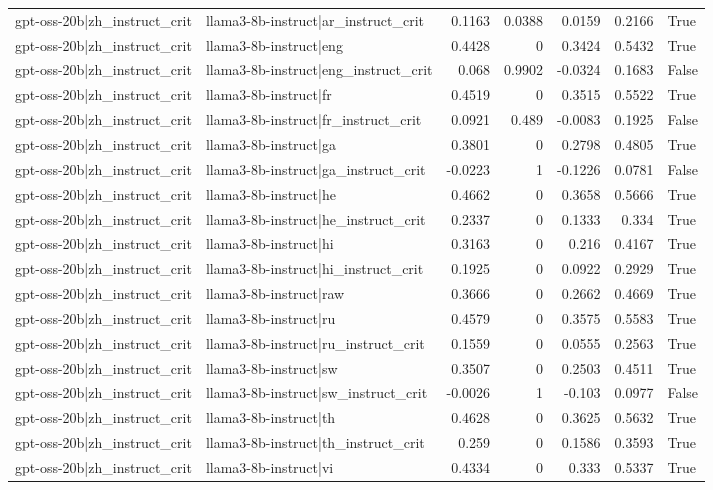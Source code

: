 \begin{table}
\begin{tabular}{l l r r r r l}
gpt-oss-20b|zh_instruct_crit & llama3-8b-instruct|ar_instruct_crit & 0.1163 & 0.0388 & 0.0159 & 0.2166 & True \\
gpt-oss-20b|zh_instruct_crit & llama3-8b-instruct|eng & 0.4428 & 0 & 0.3424 & 0.5432 & True \\
gpt-oss-20b|zh_instruct_crit & llama3-8b-instruct|eng_instruct_crit & 0.068 & 0.9902 & -0.0324 & 0.1683 & False \\
gpt-oss-20b|zh_instruct_crit & llama3-8b-instruct|fr & 0.4519 & 0 & 0.3515 & 0.5522 & True \\
gpt-oss-20b|zh_instruct_crit & llama3-8b-instruct|fr_instruct_crit & 0.0921 & 0.489 & -0.0083 & 0.1925 & False \\
gpt-oss-20b|zh_instruct_crit & llama3-8b-instruct|ga & 0.3801 & 0 & 0.2798 & 0.4805 & True \\
gpt-oss-20b|zh_instruct_crit & llama3-8b-instruct|ga_instruct_crit & -0.0223 & 1 & -0.1226 & 0.0781 & False \\
gpt-oss-20b|zh_instruct_crit & llama3-8b-instruct|he & 0.4662 & 0 & 0.3658 & 0.5666 & True \\
gpt-oss-20b|zh_instruct_crit & llama3-8b-instruct|he_instruct_crit & 0.2337 & 0 & 0.1333 & 0.334 & True \\
gpt-oss-20b|zh_instruct_crit & llama3-8b-instruct|hi & 0.3163 & 0 & 0.216 & 0.4167 & True \\
gpt-oss-20b|zh_instruct_crit & llama3-8b-instruct|hi_instruct_crit & 0.1925 & 0 & 0.0922 & 0.2929 & True \\
gpt-oss-20b|zh_instruct_crit & llama3-8b-instruct|raw & 0.3666 & 0 & 0.2662 & 0.4669 & True \\
gpt-oss-20b|zh_instruct_crit & llama3-8b-instruct|ru & 0.4579 & 0 & 0.3575 & 0.5583 & True \\
gpt-oss-20b|zh_instruct_crit & llama3-8b-instruct|ru_instruct_crit & 0.1559 & 0 & 0.0555 & 0.2563 & True \\
gpt-oss-20b|zh_instruct_crit & llama3-8b-instruct|sw & 0.3507 & 0 & 0.2503 & 0.4511 & True \\
gpt-oss-20b|zh_instruct_crit & llama3-8b-instruct|sw_instruct_crit & -0.0026 & 1 & -0.103 & 0.0977 & False \\
gpt-oss-20b|zh_instruct_crit & llama3-8b-instruct|th & 0.4628 & 0 & 0.3625 & 0.5632 & True \\
gpt-oss-20b|zh_instruct_crit & llama3-8b-instruct|th_instruct_crit & 0.259 & 0 & 0.1586 & 0.3593 & True \\
gpt-oss-20b|zh_instruct_crit & llama3-8b-instruct|vi & 0.4334 & 0 & 0.333 & 0.5337 & True \\

\end{tabular}
\end{table}
